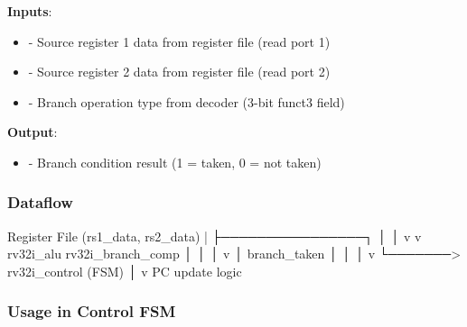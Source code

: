 \begin{record}

\textbf{Inputs}:

\begin{itemize}
\tightlist
\item
   - Source register 1 data from register file (read port
  1)
\item
   - Source register 2 data from register file (read port
  2)
\item
   - Branch operation type from decoder (3-bit funct3
  field)
\end{itemize}

\textbf{Output}:

\begin{itemize}
\tightlist
\item
   - Branch condition result (1 = taken, 0 = not
  taken)
\end{itemize}

\end{record}

\subsubsection{Dataflow}\label{cr:fix:cpu-integration-summary:dataflow}

\begin{record}

\begin{textblock}
Register File (rs1_data, rs2_data)
        |
        ├────────────────┐
        │                │
        v                v
    rv32i_alu      rv32i_branch_comp
        │                │
        │                v
        │          branch_taken
        │                │
        │                v
        └───────> rv32i_control (FSM)
                       │
                       v
                  PC update logic
\end{textblock}

\end{record}

\subsubsection{Usage in Control FSM}\label{cr:fix:cpu-integration-summary:usage-in-control-fsm}

